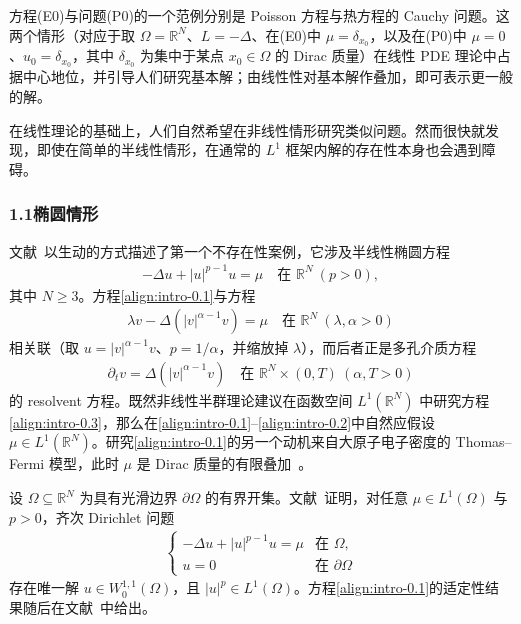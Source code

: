 \documentclass[../main.tex]{subfiles}
\begin{document}
方程(E0)与问题(P0)的一个范例分别是 Poisson 方程与热方程的 Cauchy 问题。这两个情形（对应于取 $\Omega=\mathbb{R}^N$、$L=-\Delta$、在(E0)中 $\mu=\delta_{x_0}$，以及在(P0)中 $\mu=0$、$u_0=\delta_{x_0}$，其中 $\delta_{x_0}$ 为集中于某点 $x_0\in\Omega$ 的 Dirac 质量）在线性 PDE 理论中占据中心地位，并引导人们研究基本解；由线性性对基本解作叠加，即可表示更一般的解。

在线性理论的基础上，人们自然希望在非线性情形研究类似问题。然而很快就发现，即使在简单的半线性情形，在通常的 $L^1$ 框架内解的存在性本身也会遇到障碍。

\subsubsection*{1.1\quad 椭圆情形}\label{subsubsection:intro-elliptic}

文献~\cite{ref14}以生动的方式描述了第一个不存在性案例，它涉及半线性椭圆方程
\begin{align}
-\Delta u + |u|^{p-1}u = \mu \quad \text{在 }\mathbb{R}^N\ (p>0), \label{align:intro-0.1}
\end{align}
其中 $N\geqslant 3$。方程\eqref{align:intro-0.1}与方程
\begin{align}
\lambda v - \Delta(|v|^{\alpha-1}v) = \mu \quad \text{在 }\mathbb{R}^N\ (\lambda,\alpha>0) \label{align:intro-0.2}
\end{align}
相关联（取 $u=|v|^{\alpha-1}v$、$p=1/\alpha$，并缩放掉 $\lambda$），而后者正是多孔介质方程
\begin{align}
\partial_t v = \Delta(|v|^{\alpha-1}v) \quad \text{在 }\mathbb{R}^N\times(0,T)\ (\alpha,T>0) \label{align:intro-0.3}
\end{align}
的 resolvent 方程。既然非线性半群理论建议在函数空间 $L^1(\mathbb{R}^N)$ 中研究方程\eqref{align:intro-0.3}，那么在\eqref{align:intro-0.1}–\eqref{align:intro-0.2}中自然应假设 $\mu\in L^1(\mathbb{R}^N)$。研究\eqref{align:intro-0.1}的另一个动机来自大原子电子密度的 Thomas--Fermi 模型，此时 $\mu$ 是 Dirac 质量的有限叠加~\cite{ref65}。

设 $\Omega\subseteq\mathbb{R}^N$ 为具有光滑边界 $\partial\Omega$ 的有界开集。文献~\cite{ref28}证明，对任意 $\mu\in L^1(\Omega)$ 与 $p>0$，齐次 Dirichlet 问题
\begin{align*}
\begin{cases}
-\Delta u + |u|^{p-1}u = \mu & \text{在 }\Omega,\\
u = 0 & \text{在 }\partial\Omega
\end{cases}
\end{align*}
存在唯一解 $u\in W^{1,1}_0(\Omega)$，且 $|u|^p\in L^1(\Omega)$。方程\eqref{align:intro-0.1}的适定性结果随后在文献~\cite{ref15}中给出。
\end{document}
